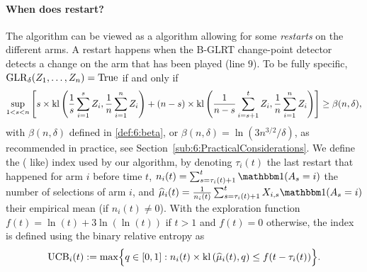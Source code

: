 \paragraph{When does \GLRklUCB{} restart?}

The \GLRklUCB{} algorithm can be viewed as a \klUCB{} algorithm allowing for some \emph{restarts} on the different arms. A restart happens when the B-GLRT change-point detector detects a change on the arm that has been played (line $9$).
%
To be fully specific, $\mathrm{GLR}_\delta(Z_1,\dots,Z_n) = \mathrm{True}$ if and only if
\begin{equation}\label{eq:whenDoesGLRklUCBrestart}
    \sup_{1 < s < n} \left[s \times \mathrm{kl} \left(\frac{1}{s}\sum_{i=1}^s Z_i , \frac{1}{n}\sum_{i=1}^n Z_i\right) + (n-s) \times \mathrm{kl} \left(\frac{1}{n-s}\sum_{i=s+1}^t Z_i , \frac{1}{n}\sum_{i=1}^n Z_i\right)\right] \geq \beta(n,\delta),
\end{equation}
%
with $\beta(n,\delta)$ defined in \eqref{def:6:beta}, or $\beta(n,\delta) = \ln(3n^{3/2}/\delta)$, as recommended in practice, see Section~\ref{sub:6:PracticalConsiderations}. We define the (\klUCB{} like) index used by our algorithm, by denoting
$\tau_i(t)$ the last restart that happened for arm $i$ before time $t$,
$n_i(t) = \sum_{s=\tau_i(t)+1}^{t} \indic(A_s=i)$
the number of selections of arm $i$, and
$\widehat{\mu}_i(t) = \frac{1}{n_i(t)} \sum_{s=\tau_i(t)+1}^{t}X_{i,s} \indic(A_s=i)$
their empirical mean (if $n_i(t)\neq0$).
%
With the exploration function $f(t) = \ln(t) + 3 \ln(\ln(t))$ if $t>1$ and $f(t)=0$ otherwise,
the index is defined using the binary relative entropy as
%
\begin{equation}\label{def:6:UCB}
    \mathrm{UCB}_i(t) := \max \Bigl\{ q\in[0,1] : n_i(t) \times \mathrm{kl}\left(\widehat{\mu}_i(t),q\right) \leq f(t - \tau_i(t)) \Bigr\}.
\end{equation}


